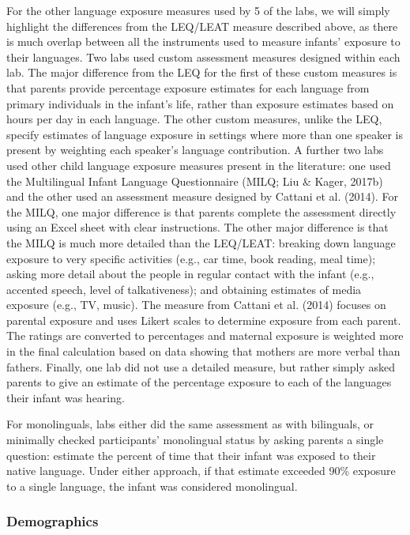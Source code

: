 \documentclass[
  english,
  ,man,floatsintext]{apa6}
\begin{document}
For the other language exposure measures used by 5 of the labs, we will simply highlight the differences from the LEQ/LEAT measure described above, as there is much overlap between all the instruments used to measure infants' exposure to their languages. Two labs used custom assessment measures designed within each lab. The major difference from the LEQ for the first of these custom measures is that parents provide percentage exposure estimates for each language from primary individuals in the infant's life, rather than exposure estimates based on hours per day in each language. The other custom measures, unlike the LEQ, specify estimates of language exposure in settings where more than one speaker is present by weighting each speaker's language contribution. A further two labs used other child language exposure measures present in the literature: one used the Multilingual Infant Language Questionnaire (MILQ; Liu \& Kager, 2017b) and the other used an assessment measure designed by Cattani et al. (2014). For the MILQ, one major difference is that parents complete the assessment directly using an Excel sheet with clear instructions. The other major difference is that the MILQ is much more detailed than the LEQ/LEAT: breaking down language exposure to very specific activities (e.g., car time, book reading, meal time); asking more detail about the people in regular contact with the infant (e.g., accented speech, level of talkativeness); and obtaining estimates of media exposure (e.g., TV, music). The measure from Cattani et al. (2014) focuses on parental exposure and uses Likert scales to determine exposure from each parent. The ratings are converted to percentages and maternal exposure is weighted more in the final calculation based on data showing that mothers are more verbal than fathers. Finally, one lab did not use a detailed measure, but rather simply asked parents to give an estimate of the percentage exposure to each of the languages their infant was hearing.

For monolinguals, labs either did the same assessment as with bilinguals, or minimally checked participants' monolingual status by asking parents a single question: estimate the percent of time that their infant was exposed to their native language. Under either approach, if that estimate exceeded 90\% exposure to a single language, the infant was considered monolingual.

\hypertarget{demographics}{%
\subsubsection{Demographics}\label{demographics}}
\end{document}
